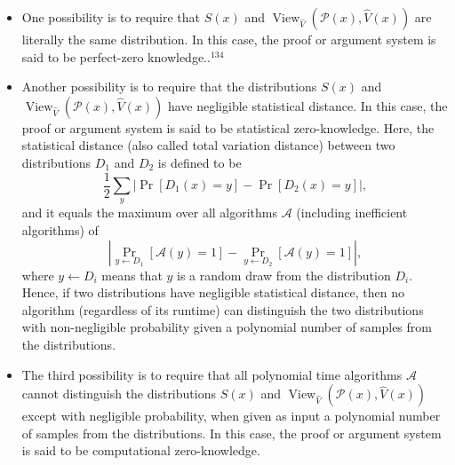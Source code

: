 \begin{itemize}
    \item One possibility is to require that $S(x)$ and $\operatorname{View}_{\hat{V}}(\mathcal{P}(x), \hat{V}(x))$ are literally the same distribution. In this case, the proof or argument system is said to be perfect-zero knowledge..$^{134}$
    \item Another possibility is to require that the distributions $S(x)$ and $\operatorname{View}_{\hat{V}}(\mathcal{P}(x), \hat{V}(x))$ have negligible statistical distance. In this case, the proof or argument system is said to be statistical zero-knowledge. Here, the statistical distance (also called total variation distance) between two distributions $D_1$ and $D_2$ is defined to be
    $$
    \frac{1}{2} \sum_y\left|\operatorname{Pr}\left[D_1(x)=y\right]-\operatorname{Pr}\left[D_2(x)=y\right]\right|,
    $$
    and it equals the maximum over all algorithms $\mathcal{A}$ (including inefficient algorithms) of
    $$
    \left|\underset{y \leftarrow D_1}{\operatorname{Pr}}[\mathcal{A}(y)=1]-\underset{y \leftarrow D_2}{\operatorname{Pr}}[\mathcal{A}(y)=1]\right|,
    $$
    where $y \leftarrow D_i$ means that $y$ is a random draw from the distribution $D_i$. Hence, if two distributions have negligible statistical distance, then no algorithm (regardless of its runtime) can distinguish the two distributions with non-negligible probability given a polynomial number of samples from the distributions.
    \item The third possibility is to require that all polynomial time algorithms $\mathcal{A}$ cannot distinguish the distributions $S(x)$ and $\operatorname{View}_{\hat{V}}(\mathcal{P}(x), \hat{V}(x))$ except with negligible probability, when given as input a polynomial number of samples from the distributions. In this case, the proof or argument system is said to be computational zero-knowledge.
\end{itemize}

